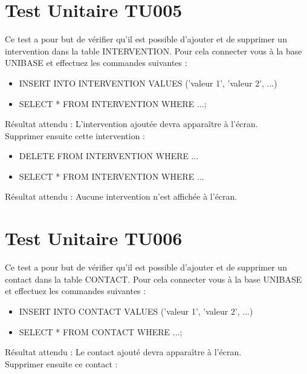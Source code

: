 	
\section{Test Unitaire TU005}
	Ce test a pour but de vérifier qu'il est possible d'ajouter et de supprimer un intervention dans la table INTERVENTION. Pour cela connecter vous à la base UNIBASE et effectuez les commandes suivantes : \\
	
	\begin{itemize}
		\item INSERT INTO INTERVENTION VALUES ('valeur 1', 'valeur 2', ...)
		\item SELECT * FROM INTERVENTION WHERE ...;
	\end{itemize}
	
	Résultat attendu : L'intervention ajoutée devra apparaître à l'écran. \\
	
	Supprimer ensuite cette intervention : \\
	
	\begin{itemize}
		\item DELETE FROM INTERVENTION WHERE ...
		\item SELECT * FROM INTERVENTION WHERE ...
	\end{itemize}	 
	
	Résultat attendu : Aucune intervention n'est affichée à l'écran.
	
	
	
\section{Test Unitaire TU006}
	Ce test a pour but de vérifier qu'il est possible d'ajouter et de supprimer un contact dans la table CONTACT. Pour cela connecter vous à la base UNIBASE et effectuez les commandes suivantes : \\
	
	\begin{itemize}
		\item INSERT INTO CONTACT VALUES ('valeur 1', 'valeur 2', ...)
		\item SELECT * FROM CONTACT WHERE ...;
	\end{itemize}
	
	Résultat attendu : Le contact ajouté devra apparaître à l'écran. \\
	
	Supprimer ensuite ce contact : \\
	
